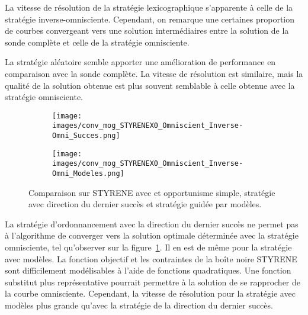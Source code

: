 La vitesse de résolution de la stratégie lexicographique s'apparente à celle de la stratégie inverse-omnisciente. Cependant, on remarque une certaines proportion de courbes convergeant vers une solution intermédiaires entre la solution de la sonde complète et celle de la stratégie omnisciente.

La stratégie aléatoire semble apporter une amélioration de performance en comparaison avec la sonde complète. La vitesse de résolution est similaire, mais la qualité de la solution obtenue est plus souvent semblable à celle obtenue avec la stratégie omnisciente.

\begin{figure}[!htb]
	\centering
	\begin{subfigure}{0.43\textwidth}
		\texttt{[image: images/conv\_mog\_STYRENEX0\_Omniscient\_Inverse-Omni\_Succes.png]}
	\end{subfigure}%
	\begin{subfigure}{0.43\textwidth}
		\texttt{[image: images/conv\_mog\_STYRENEX0\_Omniscient\_Inverse-Omni\_Modeles.png]}
	\end{subfigure}
	\caption{Comparaison sur STYRENE avec \MADS et opportunisme simple, stratégie avec direction du dernier succès et stratégie guidée par modèles.}
	\label{fig:m_styrene_2}
\end{figure}

La stratégie d'ordonnancement avec la direction du dernier succès ne permet pas à l'algorithme de converger vers la solution optimale déterminée avec la stratégie omnisciente, tel qu'observer sur la figure~\ref{fig:m_styrene_2}. Il en est de même pour la stratégie avec modèles. La fonction objectif et les contraintes de la boîte noire STYRENE sont difficilement modélisables à l'aide de fonctions quadratiques. Une fonction substitut plus représentative pourrait permettre à la solution de se rapprocher de la courbe omnisciente. Cependant, la vitesse de résolution pour la stratégie avec modèles plus grande qu'avec la stratégie de la direction du dernier succès.

